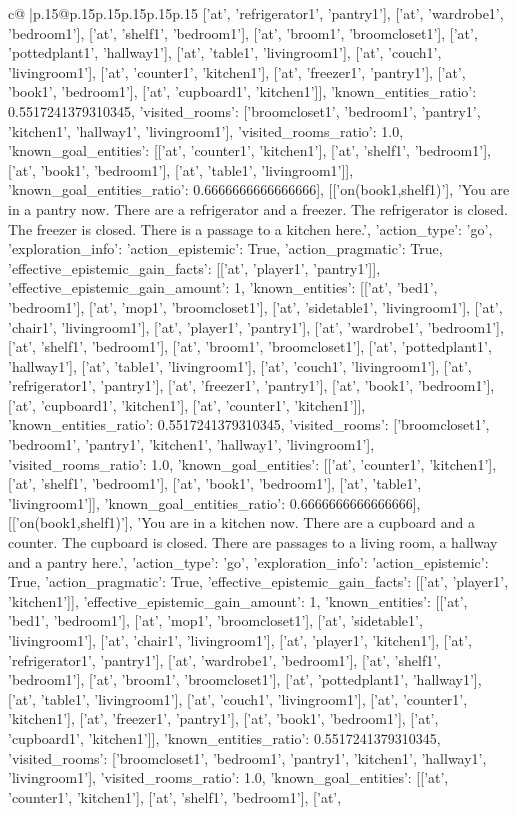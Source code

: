 \documentclass{article}
\begin{document}
{\begin{supertabular}{c@{$\;$}|p{.15\linewidth}@{}p{.15\linewidth}p{.15\linewidth}p{.15\linewidth}p{.15\linewidth}p{.15\linewidth}}
{{{['at', 'refrigerator1', 'pantry1'], ['at', 'wardrobe1', 'bedroom1'], ['at', 'shelf1', 'bedroom1'], ['at', 'broom1', 'broomcloset1'], ['at', 'pottedplant1', 'hallway1'], ['at', 'table1', 'livingroom1'], ['at', 'couch1', 'livingroom1'], ['at', 'counter1', 'kitchen1'], ['at', 'freezer1', 'pantry1'], ['at', 'book1', 'bedroom1'], ['at', 'cupboard1', 'kitchen1']], 'known_entities_ratio': 0.5517241379310345, 'visited_rooms': ['broomcloset1', 'bedroom1', 'pantry1', 'kitchen1', 'hallway1', 'livingroom1'], 'visited_rooms_ratio': 1.0, 'known_goal_entities': [['at', 'counter1', 'kitchen1'], ['at', 'shelf1', 'bedroom1'], ['at', 'book1', 'bedroom1'], ['at', 'table1', 'livingroom1']], 'known_goal_entities_ratio': 0.6666666666666666}}], [['on(book1,shelf1)'], 'You are in a pantry now. There are a refrigerator and a freezer. The refrigerator is closed. The freezer is closed. There is a passage to a kitchen here.', {'action_type': 'go', 'exploration_info': {'action_epistemic': True, 'action_pragmatic': True, 'effective_epistemic_gain_facts': [['at', 'player1', 'pantry1']], 'effective_epistemic_gain_amount': 1, 'known_entities': [['at', 'bed1', 'bedroom1'], ['at', 'mop1', 'broomcloset1'], ['at', 'sidetable1', 'livingroom1'], ['at', 'chair1', 'livingroom1'], ['at', 'player1', 'pantry1'], ['at', 'wardrobe1', 'bedroom1'], ['at', 'shelf1', 'bedroom1'], ['at', 'broom1', 'broomcloset1'], ['at', 'pottedplant1', 'hallway1'], ['at', 'table1', 'livingroom1'], ['at', 'couch1', 'livingroom1'], ['at', 'refrigerator1', 'pantry1'], ['at', 'freezer1', 'pantry1'], ['at', 'book1', 'bedroom1'], ['at', 'cupboard1', 'kitchen1'], ['at', 'counter1', 'kitchen1']], 'known_entities_ratio': 0.5517241379310345, 'visited_rooms': ['broomcloset1', 'bedroom1', 'pantry1', 'kitchen1', 'hallway1', 'livingroom1'], 'visited_rooms_ratio': 1.0, 'known_goal_entities': [['at', 'counter1', 'kitchen1'], ['at', 'shelf1', 'bedroom1'], ['at', 'book1', 'bedroom1'], ['at', 'table1', 'livingroom1']], 'known_goal_entities_ratio': 0.6666666666666666}}], [['on(book1,shelf1)'], 'You are in a kitchen now. There are a cupboard and a counter. The cupboard is closed. There are passages to a living room, a hallway and a pantry here.', {'action_type': 'go', 'exploration_info': {'action_epistemic': True, 'action_pragmatic': True, 'effective_epistemic_gain_facts': [['at', 'player1', 'kitchen1']], 'effective_epistemic_gain_amount': 1, 'known_entities': [['at', 'bed1', 'bedroom1'], ['at', 'mop1', 'broomcloset1'], ['at', 'sidetable1', 'livingroom1'], ['at', 'chair1', 'livingroom1'], ['at', 'player1', 'kitchen1'], ['at', 'refrigerator1', 'pantry1'], ['at', 'wardrobe1', 'bedroom1'], ['at', 'shelf1', 'bedroom1'], ['at', 'broom1', 'broomcloset1'], ['at', 'pottedplant1', 'hallway1'], ['at', 'table1', 'livingroom1'], ['at', 'couch1', 'livingroom1'], ['at', 'counter1', 'kitchen1'], ['at', 'freezer1', 'pantry1'], ['at', 'book1', 'bedroom1'], ['at', 'cupboard1', 'kitchen1']], 'known_entities_ratio': 0.5517241379310345, 'visited_rooms': ['broomcloset1', 'bedroom1', 'pantry1', 'kitchen1', 'hallway1', 'livingroom1'], 'visited_rooms_ratio': 1.0, 'known_goal_entities': [['at', 'counter1', 'kitchen1'], ['at', 'shelf1', 'bedroom1'], ['at', }}}
\end{supertabular}}
\end{document}
